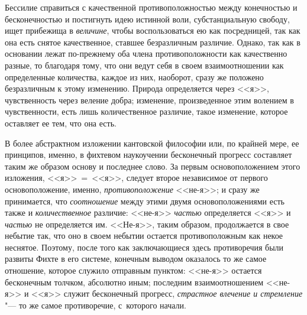 Бессилие справиться с качественной противоположностью между конечностью и
бесконечностью и постигнуть идею истинной воли, субстанциальную свободу, ищет
прибежища в {\em величине}, чтобы воспользоваться ею как посредницей, так как
она есть снятое качественное, ставшее безразличным различие. Однако, так как
в основании лежат по-прежнему оба члена противоположности как качественно
разные, то благодаря тому, что они ведут себя в своем взаимоотношении как
определенные количества, каждое из них, наоборот, сразу же положено
безразличным к этому изменению. Природа определяется через <<я>>, чувственность
через веление добра; изменение, произведенное этим волением в чувственности,
есть лишь количественное различие, такое изменение, которое оставляет ее тем,
что она есть.

В более абстрактном изложении кантовской философии или, по крайней мере, ее
принципов, именно, в фихтевом наукоучении бесконечный прогресс составляет таким
же образом основу и последнее слово. За первым основоположением этого
изложения, <<я>>~=~<<я>>, следует второе независимое от первого
основоположение, именно, {\em противоположение} <<не-я>>; и сразу же
принимается, что {\em соотношение} между этими двумя основоположениями есть
также и {\em количественное} различие: <<не-я>> {\em частью} определяется <<я>>
и {\em частью} не определяется им. <<Не-я>>, таким образом, продолжается в свое
небытие так, что оно в своем небытии остается противоположным как некое
неснятое. Поэтому, после того как заключающиеся здесь противоречия были развиты
Фихте в его системе, конечным выводом оказалось то же самое отношение, которое
служило отправным пунктом: <<не-я>> остается бесконечным
толчком, абсолютно иным; последним
взаимоотношением <<не-я>> и <<я>> служит бесконечный прогресс, {\em страстное
влечение и стремление} "--- то же самое противоречие, с~которого начали.

